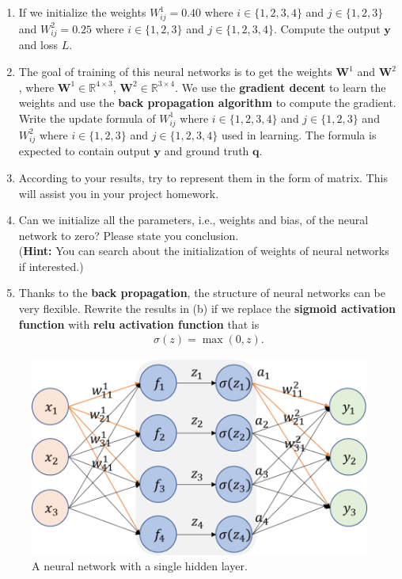 \documentclass[11pt,letter,notitlepage]{article}
\begin{document}
\begin{exercise}
\begin{enumerate}
	\begin{enumerate}
            \item If we initialize the weights $W_{ij}^1 = 0.40$ where $i\in\{1,2,3,4\}$ and $j\in\{1,2,3\}$ and $W_{ij}^2 = 0.25$ where $i\in\{1,2,3\}$ and $j\in\{1,2,3,4\}$. Compute the  output $\mathbf{y}$ and loss $L$.
            \item The goal of training of this neural networks is to get the weights $\mathbf{W}^1$ and $\mathbf{W}^2$, where $\mathbf{W}^1 \in \mathbb{R}^{4\times3}$, $\mathbf{W}^2 \in \mathbb{R}^{3\times4}$. We use the \textbf{gradient decent} to learn the weights and use the \textbf{back propagation algorithm} to compute the gradient. Write the update formula  of $W_{ij}^1$ where $i\in\{1,2,3,4\}$ and $j\in\{1,2,3\}$ and $W_{ij}^2$ where $i\in\{1,2,3\}$ and $j\in\{1,2,3,4\}$ used in learning. The formula is expected to contain output $\mathbf{y}$ and ground truth $\mathbf{q}$.
            \item According to your results, try to represent them in the form of matrix. This will assist you in your project homework.
            \item Can we initialize all the parameters, i.e., weights and bias, of the neural network to zero? Please state you conclusion.\\
            (\textbf{Hint:} You can search about the initialization of weights of neural networks if interested.)
            \item Thanks to the \textbf{back propagation}, the structure of neural networks can be very flexible. Rewrite the results in (b) if we replace the \textbf{sigmoid activation function} with \textbf{relu activation function} that is 
            \begin{align*}
                \sigma(z) = \max(0, z).
            \end{align*}
	\end{enumerate}
\end{enumerate}
\end{exercise}
\begin{figure}[h]
  \centering\includegraphics[width=12cm]{Figures/2021_fall_nn.png}
  \caption{A neural network with a single hidden layer.}
  \label{backpropogation}
\end{figure}
\begin{solution}${}$

\end{solution}
\end{document}

